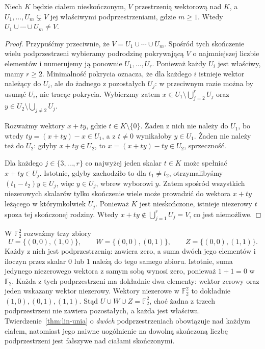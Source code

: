 \begin{twierdzenie}
\label{thm:lin-skonczona-unia-nieskonczone-cialo}
Niech \(K\) będzie ciałem nieskończonym,
\(V\) przestrzenią wektorową nad \(K\),
a \(U_1,\ldots,U_m\subsetneq V\) jej właściwymi
podprzestrzeniami, gdzie \(m\geq1\).
Wtedy \(U_1\cup\cdots\cup U_m\neq V\).
\end{twierdzenie}
\begin{proof}
Przypuśćmy przeciwnie, że \(V=U_1\cup\cdots\cup U_m\).
Spośród tych skończenie wielu podprzestrzeni
wybieramy podrodzinę pokrywającą \(V\)
o najmniejszej liczbie elementów i numerujemy
ją ponownie \(U_1,\ldots,U_r\).
Ponieważ każdy \(U_i\) jest właściwy, mamy \(r\geq2\).
Minimalność pokrycia oznacza, że dla każdego \(i\)
istnieje wektor należący do \(U_i\), ale do żadnego
z pozostałych \(U_j\): w przeciwnym razie można by
usunąć \(U_i\), nie tracąc pokrycia.
Wybierzmy zatem
\(x\in U_1\setminus\bigcup_{j=2}^r U_j\)
oraz \(y\in U_2\setminus\bigcup_{j\neq2} U_j\).

Rozważmy wektory \(x+ty\), gdzie
\(t\in K\setminus\{0\}\).
Żaden z nich nie należy do \(U_1\),
bo wtedy \(ty=(x+ty)-x\in U_1\),
a z \(t\neq0\) wynikałoby \(y\in U_1\).
Żaden nie należy też do \(U_2\):
gdyby \(x+ty\in U_2\), to
\(x=(x+ty)-ty\in U_2\), sprzeczność.

Dla każdego \(j\in\{3,\ldots,r\}\)
co najwyżej jeden skalar \(t\in K\)
może spełniać \(x+ty\in U_j\).
Istotnie, gdyby zachodziło to dla
\(t_1\neq t_2\), otrzymalibyśmy
\((t_1-t_2)y\in U_j\), więc \(y\in U_j\),
wbrew wyborowi \(y\).
Zatem spośród wszystkich niezerowych skalarów
tylko skończenie wiele może prowadzić
do wektora \(x+ty\) leżącego w którymkolwiek \(U_j\).
Ponieważ \(K\) jest nieskończone, istnieje
niezerowy \(t\) spoza tej skończonej rodziny.
Wtedy \(x+ty\notin\bigcup_{j=1}^rU_j=V\),
co jest niemożliwe.
\end{proof}

\begin{przyklad}
\label{prz:lin-unia-trzech-f2}
W \(\mathbb F_2^2\) rozważmy trzy zbiory
\[
 U=\{(0,0),(1,0)\},\qquad
 W=\{(0,0),(0,1)\},\qquad
 Z=\{(0,0),(1,1)\}.
\]
Każdy z nich jest podprzestrzenią:
zawiera zero, a suma dwóch jego elementów
i iloczyn przez skalar \(0\) lub \(1\)
należą do tego samego zbioru.
Istotnie, suma jedynego niezerowego wektora
z samym sobą wynosi zero,
ponieważ \(1+1=0\) w \(\mathbb F_2\).
Każda z tych podprzestrzeni ma dokładnie
dwa elementy: wektor zerowy oraz
jeden wskazany wektor niezerowy.
Wektory niezerowe w \(\mathbb F_2^2\)
to dokładnie \((1,0),(0,1),(1,1)\).
Stąd \(U\cup W\cup Z=\mathbb F_2^2\),
choć żadna z trzech podprzestrzeni
nie zawiera pozostałych, a każda jest właściwa.
Twierdzenie~\ref{thm:lin-unia} o \emph{dwóch}
podprzestrzeniach obowiązuje nad każdym ciałem,
natomiast jego naiwne uogólnienie na
dowolną skończoną liczbę podprzestrzeni
jest fałszywe nad ciałami skończonymi.
\end{przyklad}

